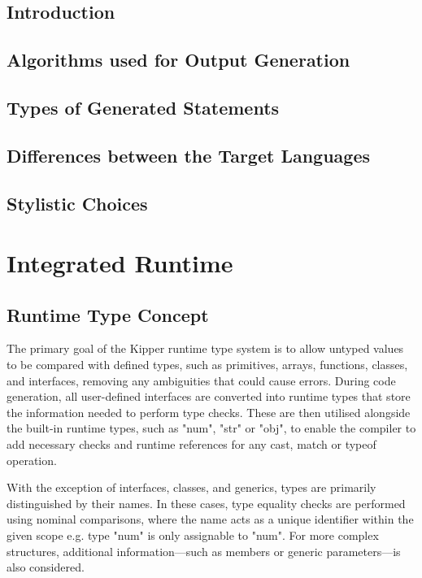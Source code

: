 \subsection{Introduction}

\subsection{Algorithms used for Output Generation}

\subsection{Types of Generated Statements}

\subsection{Differences between the Target Languages}

\subsection{Stylistic Choices}

\section{Integrated Runtime}

\subsection{Runtime Type Concept}

The primary goal of the Kipper runtime type system is to allow untyped values to be compared with defined types, such as primitives, arrays, functions, classes, and interfaces, removing any ambiguities that could cause errors. During code generation, all user-defined interfaces are converted into runtime types that store the information needed to perform type checks. These are then utilised alongside the built-in runtime types, such as "num", "str" or "obj", to enable the compiler to add necessary checks and runtime references for any cast, match or typeof operation.

With the exception of interfaces, classes, and generics, types are primarily distinguished by their names. In these cases, type equality checks are performed using nominal comparisons, where the name acts as a unique identifier within the given scope e.g. type "num" is only assignable to "num". For more complex structures, additional information—such as members or generic parameters—is also considered.

